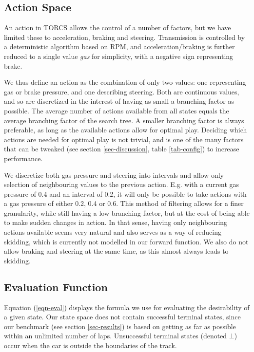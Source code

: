\documentclass[conference]{IEEEtran}
\begin{document}
\subsection{Action Space}
An action in TORCS allows the control of a number of factors, but we have limited these to acceleration, braking and steering. Transmission is controlled by a deterministic algorithm based on RPM, and acceleration/braking is further reduced to a single value \emph{gas} for simplicity, with a negative sign representing brake.

We thus define an action as the combination of only two values: one representing gas or brake pressure, and one describing steering. Both are continuous values, and so are discretized in the interest of having as small a branching factor as possible. The average number of actions available from all states equals the average branching factor of the search tree. A smaller branching factor is always preferable, as long as the available actions allow for optimal play. Deciding which actions are needed for optimal play is not trivial, and is one of the many factors that can be tweaked (see section \ref{sec-discussion}, table \ref{tab-config}) to increase performance.

We discretize both gas pressure and steering into intervals and allow only selection of neighbouring values to the previous action. E.g. with a current gas pressure of 0.4 and an interval of 0.2, it will only be possible to take actions with a gas pressure of either 0.2, 0.4 or 0.6. This method of filtering allows for a finer granularity, while still having a low branching factor, but at the cost of being able to make sudden changes in action. In that sense, having only neighbouring actions available seems very natural and also serves as a way of reducing skidding, which is currently not modelled in our forward function. We also do not allow braking and steering at the same time, as this almost always leads to skidding.

\subsection{Evaluation Function}
Equation (\ref{eqn-eval}) displays the formula we use for evaluating the desirability of a given state. Our state space does not contain successful terminal states, since our benchmark (see section \ref{sec-results}) is based on getting as far as possible within an unlimited number of laps. Unsuccessful terminal states (denoted $\bot$) occur when the car is outside the boundaries of the track.
\end{document}
